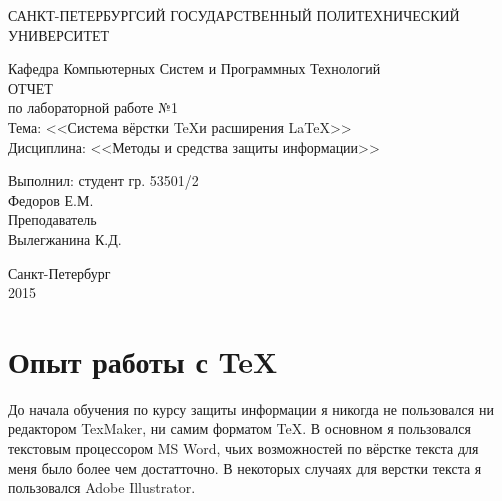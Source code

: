 \documentclass[utf8x, 12pt]{G7-32}
\begin{document}
\frontmatter 


\begin{center} 

\large САНКТ-ПЕТЕРБУРГСИЙ ГОСУДАРСТВЕННЫЙ ПОЛИТЕХНИЧЕСКИЙ УНИВЕРСИТЕТ

\large Кафедра Компьютерных Систем и Программных Технологий \\[5.5cm] 

\huge ОТЧЕТ \\[0.6cm] %
\large по лабораторной работе №1\\
\large Тема: <<Система вёрстки \TeX и расширения \LaTeX>>\\
\large Дисциплина: <<Методы и средства защиты информации>>\\[3.7cm]

\end{center} 

\begin{flushright}
Выполнил: студент гр. 53501/2 \\
Федоров Е.М. \\[1.2cm]


Преподаватель \\
Вылегжанина К.Д.
\end{flushright}


\vfill 

\begin{center} 
\large Санкт-Петербург \\
2015
\end{center} 

\thispagestyle{empty}



\thispagestyle{empty}
\setcounter{page}{0}
\tableofcontents
\clearpage
\mainmatter



\chapter{Опыт работы с \TeX}

До начала обучения по курсу защиты информации я никогда не пользовался ни редактором TexMaker, ни самим форматом \TeX . В основном я пользовался текстовым процессором MS Word, чьих возможностей по вёрстке текста для меня было более чем достатточно. \hfil\break
В некоторых случаях для верстки текста я пользовался Adobe Illustrator.
\end{document}
